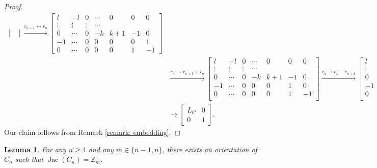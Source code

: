 \documentclass[11pt,reqno]{amsart}
\DeclareMathOperator{\Jac}{Jac}
\newcommand{\Z}{\mathbb{Z}}
\theoremstyle{definition}
\theoremstyle{plain}
\newtheorem{lem}[mydef]{Lemma}
\begin{document}
\begin{proof}
\begin{align*}
\begin{bmatrix}
			\end{bmatrix} \stackrel{r_{n+1}\leftrightarrow r_{n}}{\longrightarrow}
			\begin{bmatrix} 
				l  & -l & 0 & \cdots & 0 & 0 & 0 \\
				\vdots & \vdots & \vdots & \cdots \\
				0 & \cdots & 0 & -k & k+1 & -1 & 0  \\
				-1 & \cdots & 0 & 0 & 0 & 0 & 1 \\
				0 & \cdots & 0 & 0 & 0 & 1 & -1 
			\end{bmatrix} \\ 
			&\stackrel{r_{n} \to r_{n+1} + r_{n}}\longrightarrow 
			\begin{bmatrix} 
				l  & -l & 0 & \cdots & 0 & 0 & 0 \\
				\vdots & \vdots & \vdots & \cdots \\
				0 & \cdots & 0 & -k & k+1 & -1 & 0  \\
				-1 & \cdots & 0 & 0 & 0 & 1 & 0 \\ 
				0 & \cdots & 0 & 0 & 0 & 1 & -1 \\ 
			\end{bmatrix}
			\stackrel{c_{n} \to c_{n} - c_{n+1}}\longrightarrow 
			\begin{bmatrix} 
				l  & -l & 0 & \cdots & 0 & 0 & 0 \\
				\vdots & \vdots & \vdots & \cdots \\
				0 & \cdots & 0 & -k & k+1 & -1 & 0  \\
				-1 & \cdots & 0 & 0 & 0 & 1 & 0 \\ 
				0 & \cdots & 0 & 0 & 0 & 0 & -1 \\ 
			\end{bmatrix} \\
			&\longrightarrow 
			\left[ \begin{array}{c|c}
				L_C & 0 \\
				\hline
				0 & 1
			\end{array} \right].
			\end{align*}
Our claim follows from Remark \ref{remark: embedding}. 
		\end{proof}

\begin{lem} \label{obj4}
			For any $n \ge 4$ and any $m \in \{ n-1, n \}$, there exists an orientation of $C_n$ such that $\Jac (C_n) = \Z_m$. 
		\end{lem}
\end{document}
